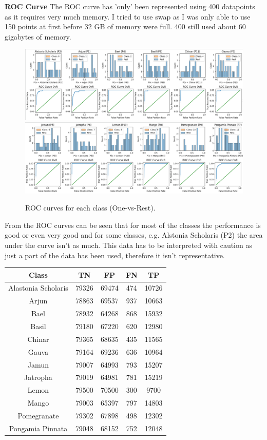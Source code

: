 \documentclass[UTF-8]{article}
\begin{document}
\textbf{ROC Curve}
The ROC curve has 'only' been represented using 400 datapoints as it requires very much memory. I tried to use swap as I was only able to use 150 points at first before 32 GB of memory were full. 400 still used about 60 gigabytes of memory.

\begin{figure}[H]
	\centering
	\includegraphics[width=0.7\linewidth]{_images/CNNroccurve450part1}
	\includegraphics[width=0.7\linewidth]{_images/CNNroccurve450part2}
	\caption{ROC curves for each class (One-vs-Rest).}
	\label{fig:cnnroccurve450}
\end{figure}
From the ROC curves can be seen that for most of the classes the performance is good or even very good and for some classes, e.g. Alstonia Scholaris (P2) the area under the curve isn't as much. This data has to be interpreted with caution as just a part of the data has been used, therefore it isn't representative.

\begin{center}
\begin{tabular}{|c|c|c|c|c|}
	\hline
	Class & TN & FP & FN & TP \\
	\hline
	Alastonia Scholaris & 79326 & 69474 & 474 & 10726 \\
	\hline
	Arjun & 78863 & 69537 & 937 & 10663 \\
	\hline
	Bael & 78932 & 64268 & 868 & 15932 \\
	\hline
	Basil & 79180 & 67220 & 620 & 12980 \\
	\hline
	Chinar & 79365 & 68635 & 435 & 11565 \\
	\hline
	Gauva & 79164 & 69236 & 636 & 10964 \\
	\hline
	Jamun & 79007 & 64993 & 793 & 15207 \\
	\hline
	Jatropha & 79019 & 64981 & 781 & 15219 \\
	\hline
	Lemon & 79500 & 70500 & 300 & 9700 \\
	\hline
	Mango & 79003 & 65397 & 797 & 14803 \\
	\hline
	Pomegranate & 79302 & 67898 & 498 & 12302 \\
	\hline
	Pongamia Pinnata & 79048 & 68152 & 752 & 12048 \\
	\hline
\end{tabular}
\end{center}
\end{document}
